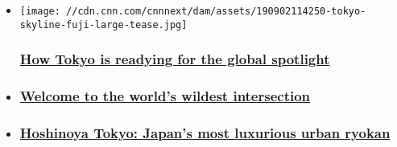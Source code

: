 \begin{itemize}
\item
  \href{/travel/article/tokyo-2020-olympics-rugby-world-cup-tourists/index.html}{}

  \texttt{[image: //cdn.cnn.com/cnnnext/dam/assets/190902114250-tokyo-skyline-fuji-large-tease.jpg]}

  \hypertarget{how-tokyo-is-readying-for-the-global-spotlight}{%
  \subsubsection{\texorpdfstring{\href{/travel/article/tokyo-2020-olympics-rugby-world-cup-tourists/index.html}{How
  Tokyo is readying for the global
  spotlight}}{How Tokyo is readying for the global spotlight}}\label{how-tokyo-is-readying-for-the-global-spotlight}}
\item
  \hypertarget{welcome-to-the-worlds-wildest-intersection-}{%
  \subsubsection{\texorpdfstring{\href{/travel/article/shibuya-crossing-tokyo-japan/index.html}{Welcome
  to the world's wildest intersection
  }}{Welcome to the world's wildest intersection }}\label{welcome-to-the-worlds-wildest-intersection-}}
\item
  \hypertarget{hoshinoya-tokyo-japans-most-luxurious-urban-ryokan-}{%
  \subsubsection{\texorpdfstring{\href{/travel/article/hoshinoya-tokyo-luxury-ryokan/index.html}{Hoshinoya
  Tokyo: Japan's most luxurious urban ryokan
  }}{Hoshinoya Tokyo: Japan's most luxurious urban ryokan }}\label{hoshinoya-tokyo-japans-most-luxurious-urban-ryokan-}}
\end{itemize}

